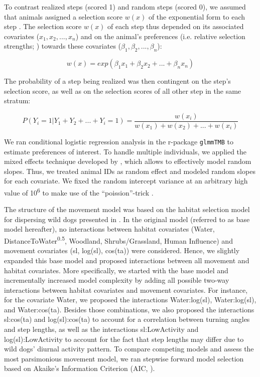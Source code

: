 \documentclass[abstract=on,10pt,a4paper,bibliography=totocnumbered]{article}
\begin{document}
To contrast realized steps (scored 1) and random steps (scored 0), we assumed
that animals assigned a selection score \(w(x)\) of the exponential form to each
step \citep{Fortin.2005}. The selection score \(w(x)\) of each step thus
depended on its associated covariates (\(x_1, x_2, ..., x_n\)) and on the
animal's preferences (i.e. relative selection strengths; \citealp{Avgar.2017})
towards these covariates (\(\beta_1, \beta_2, ..., \beta_n\)):

\begin{equation}
\label{EQ1}
  w(x) = exp(\beta_1 x_1 + \beta_2 x_2 + ... + \beta_n x_n)
\end{equation}

The probability of a step being realized was then contingent on the step's
selection score, as well as on the selection scores of all other step in the
same stratum:

\begin{equation}
\label{EQ2}
  P(Y_{i} = 1 | Y_{1} + Y_{2} + ... + Y_{i} = 1) =
  \frac{w(x_{i})}{w(x_{1}) + w(x_{2}) + ... + w(x_{i})}
\end{equation}

We ran conditional logistic regression analysis in the r-package {\tt glmmTMB}
to estimate preferences of interest. To handle multiple individuals, we applied
the mixed effects technique developed by \citep{Muff.2020}, which allows to
effectively model random slopes. Thus, we treated animal IDs as random effect
and modeled random slopes for each covariate. We fixed the random intercept
variance at an arbitrary high value of 10\textsuperscript{6} to make use of the
``poission''-trick \citep{Muff.2020}.

The structure of the movement model was based on the habitat selection model for
dispersing wild dogs presented in \cite{Hofmann.2021}. In the original model
(referred to as base model hereafter), no interactions between habitat
covariates (\textsf{Water, DistanceToWater\textsuperscript{0.5}, Woodland,
Shrubs/Grassland, Human Influence}) and movement covariates (\textsf{sl,
log(sl), cos(ta)}) were considered. Hence, we slightly expanded this base model
and proposed interactions between all movement and habitat covariates. More
specifically, we started with the base model and incrementally increased model
complexity by adding all possible two-way interactions between habitat
covariates and movement covariates. For instance, for the covariate
\textsf{Water}, we proposed the interactions \textsf{Water:log(sl)},
\textsf{Water:log(sl)}, and \textsf{Water:cos(ta)}. Besides those combinations,
we also proposed the interactions \textsf{sl:cos(ta)} and
\textsf{log(sl):cos(ta)} to account for a correlation between turning angles and
step lengths, as well as the interactions \textsf{sl:LowActivity} and
\textsf{log(sl):LowActivity} to account for the fact that step lengths may
differ due to wild dogs' diurnal activity pattern. To compare competing models
and assess the most parsimonious movement model, we ran stepwise forward model
selection based on Akaike's Information Criterion (AIC, \citealp{Burnham.2002}).
\end{document}
